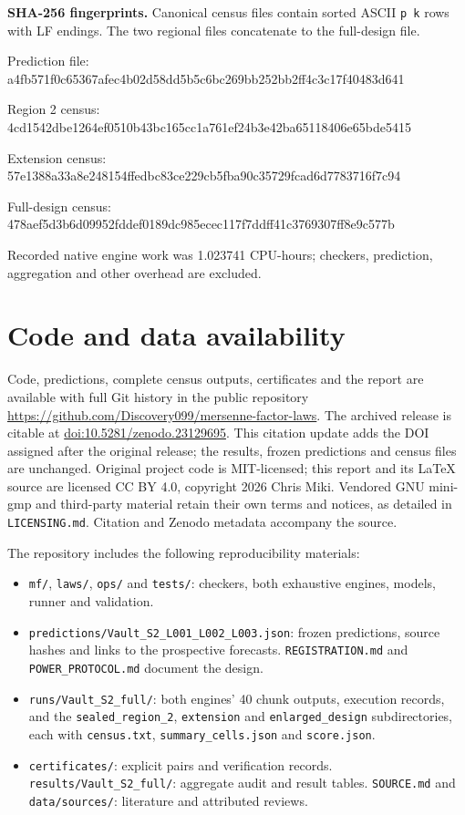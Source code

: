 \documentclass[11pt,a4paper]{article}
\newcommand{\sha}[1]{{\scriptsize\ttfamily #1}\par}
\begin{document}
\textbf{SHA-256 fingerprints.} Canonical census files contain sorted ASCII
\texttt{p k} rows with LF endings. The two regional files concatenate to
the full-design file.

Prediction file:\\[-0.6em]
\sha{a4fb571f0c65367afec4b02d58dd5b5c6bc269bb252bb2ff4c3c17f40483d641}
Region 2 census:\\[-0.6em]
\sha{4cd1542dbe1264ef0510b43bc165cc1a761ef24b3e42ba65118406e65bde5415}
Extension census:\\[-0.6em]
\sha{57e1388a33a8e248154ffedbc83ce229cb5fba90c35729fcad6d7783716f7c94}
Full-design census:\\[-0.6em]
\sha{478aef5d3b6d09952fddef0189dc985ecec117f7ddff41c3769307ff8e9c577b}

Recorded native engine work was 1.023741 CPU-hours; checkers, prediction,
aggregation and other overhead are excluded.

\newpage
\section{Code and data availability}
Code, predictions, complete census outputs, certificates and the report
are available with full Git history in the public repository
\url{https://github.com/Discovery099/mersenne-factor-laws}.
The archived release is citable at
\href{https://doi.org/10.5281/zenodo.23129695}{doi:10.5281/zenodo.23129695}.
This citation update adds the DOI assigned after the original release;
the results, frozen predictions and census files are unchanged.
Original project code is MIT-licensed; this report and its LaTeX source are
licensed CC BY 4.0, copyright 2026 Chris Miki. Vendored GNU mini-gmp and
third-party material retain their own terms and notices, as detailed in
\texttt{LICENSING.md}. Citation and Zenodo metadata accompany the source.

The repository includes the following reproducibility materials:
\begin{itemize}\small
\item \texttt{mf/}, \texttt{laws/}, \texttt{ops/} and \texttt{tests/}:
checkers, both exhaustive engines, models, runner and validation.
\item \texttt{predictions/Vault\_S2\_L001\_L002\_L003.json}:
frozen predictions, source hashes and links to the prospective forecasts.
\texttt{REGISTRATION.md} and \texttt{POWER\_PROTOCOL.md} document the design.
\item \texttt{runs/Vault\_S2\_full/}: both engines' 40 chunk outputs,
execution records, and the \texttt{sealed\_region\_2}, \texttt{extension}
and \texttt{enlarged\_design} subdirectories, each with
\texttt{census.txt}, \texttt{summary\_cells.json} and \texttt{score.json}.
\item \texttt{certificates/}: explicit pairs and verification records.
\texttt{results/Vault\_S2\_full/}: aggregate audit and result tables.
\texttt{SOURCE.md} and \texttt{data/sources/}: literature and attributed reviews.
\end{itemize}
\end{document}
